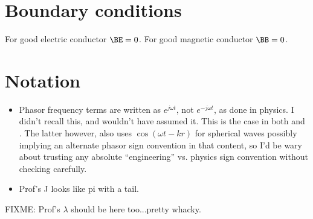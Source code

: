 \section{Boundary conditions}

For good electric conductor \( \BE = 0 \).
For good magnetic conductor \( \BB = 0 \).

\section{Notation}

\begin{itemize}
\item Phasor frequency terms are written as \( e^{j \omega t} \), not \( e^{-j \omega t} \), as done in physics.  I didn't recall this, and wouldn't have assumed it.  This is the case in both \citep{jackson1975cew:simpleRadiating} and \citep{griffiths1999introduction:waves}.  The latter however, also uses \( \cos(\omega t - k r) \) for spherical waves possibly implying an alternate phasor sign convention in that content, so I'd be wary about trusting any absolute ``engineering'' vs. physics sign convention without checking carefully.
\item Prof's J looks like pi with a tail.
\end{itemize}
FIXME: Prof's \( \lambda \) should be here too...pretty whacky.

%
%

\EndArticle
